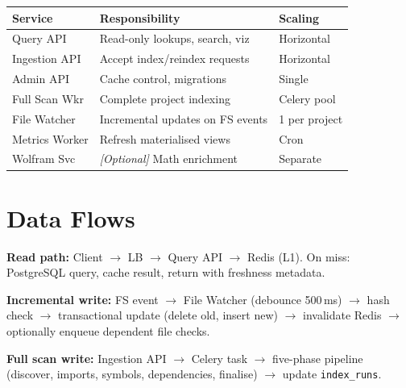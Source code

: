 \begin{table}[h]
\centering
\begin{tabular}{@{}lll@{}}
\toprule
\textbf{Service} & \textbf{Responsibility} & \textbf{Scaling} \\
\midrule
Query API      & Read-only lookups, search, viz  & Horizontal \\
Ingestion API  & Accept index/reindex requests   & Horizontal \\
Admin API      & Cache control, migrations       & Single \\
Full Scan Wkr  & Complete project indexing        & Celery pool \\
File Watcher   & Incremental updates on FS events & 1 per project \\
Metrics Worker & Refresh materialised views       & Cron \\
Wolfram Svc    & \emph{[Optional]} Math enrichment & Separate \\
\bottomrule
\end{tabular}
\end{table}

\section{Data Flows}

\textbf{Read path:} Client $\to$ LB $\to$ Query API $\to$ Redis (L1).
On miss: PostgreSQL query, cache result, return with freshness metadata.

\textbf{Incremental write:} FS event $\to$ File Watcher (debounce 500\,ms)
$\to$ hash check $\to$ transactional update (delete old, insert new)
$\to$ invalidate Redis $\to$ optionally enqueue dependent file checks.

\textbf{Full scan write:} Ingestion API $\to$ Celery task $\to$ five-phase
pipeline (discover, imports, symbols, dependencies, finalise)
$\to$ update \texttt{index\_runs}.
